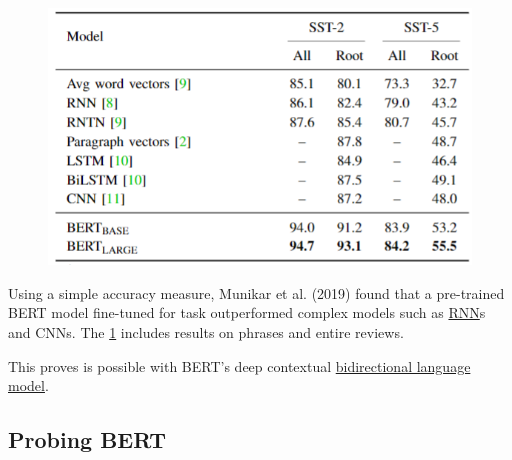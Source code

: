 % 
{
\begin{figure}
    \begin{center}
    \vspace{-30pt}
    \includegraphics[width=\linewidth]{imgs/table_bertExperimentalResults.png}
    \end{center}
\vspace{-15pt}
\label{tbl:bertExperimentResults}
\end{figure}

Using a simple accuracy measure, Munikar et al. (2019) found that a pre-trained BERT model fine-tuned for  task outperformed complex models such as \hyperref[sec:RNN]{RNN}s and CNNs. The \cref{tbl:bertExperimentResults} includes results on phrases and entire reviews. 

This proves  is possible with BERT's deep contextual \hyperref[sec:BidirectionalLM]{bidirectional language model}.





\subsection{Probing BERT} \label{sec:ProbingBERT}

}
